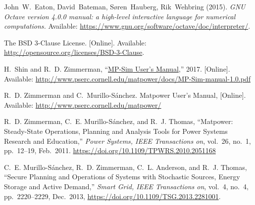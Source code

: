 \documentclass[12pt]{article}
\newcommand{\matpower}[0]{{\sc Matpower}}
\newcommand{\matpowerurl}[0]{http://www.pserc.cornell.edu/matpower/}
\newcommand{\mpsim}[0]{{MP-Sim}}
\newcommand{\mpsimver}[0]{1.0}
\newcommand{\mpsimmanurl}[0]{http://www.pserc.cornell.edu/matpower/docs/MP-Sim-manual-\mpsimver.pdf}
\newcommand{\mpsimman}[0]{\href{\mpsimmanurl}{\mpsim{} User's Manual}}
\numberwithin{equation}{section}
\numberwithin{table}{section}
\numberwithin{figure}{section}
\begin{document}
\clearpage
\begin{thebibliography}{99}

John~W.~Eaton, David~Bateman, S{\o}ren~Hauberg, Rik~Wehbring (2015). \emph{GNU Octave version 4.0.0 manual: a high-level interactive language for numerical computations.} Available: \url{https://www.gnu.org/software/octave/doc/interpreter/}.

The BSD 3-Clause License. [Online]. Available: \url{http://opensource.org/licenses/BSD-3-Clause}.

H.~Shin and R.~D. Zimmerman, ``\mpsimman{},'' 2017.
  [Online]. Available: \url{\mpsimmanurl}

R.~D. Zimmerman and C.~Murillo-S{\'a}nchez. \matpower{} User's Manual,
  [Online]. Available: \url{\matpowerurl}

R.~D. Zimmerman, C.~E. Murillo-S{\'a}nchez, and R.~J. Thomas, ``\matpower{}: Steady-State Operations, Planning and Analysis Tools for Power Systems Research and Education,'' \emph{Power Systems, IEEE Transactions on}, vol.~26, no.~1, pp.~12--19, Feb.~2011. \url{https://doi.org/10.1109/TPWRS.2010.2051168}

C.~E. Murillo-S{\'a}nchez, R.~D. Zimmerman, C.~L. Anderson, and R.~J. Thomas, ``Secure Planning and Operations of Systems with Stochastic Sources, Energy Storage and Active Demand,'' \emph{Smart Grid, IEEE Transactions on}, vol.~4, no.~4, pp.~2220--2229, Dec.~2013,
\url{https://doi.org/10.1109/TSG.2013.2281001}.

\end{thebibliography}
\end{document}
